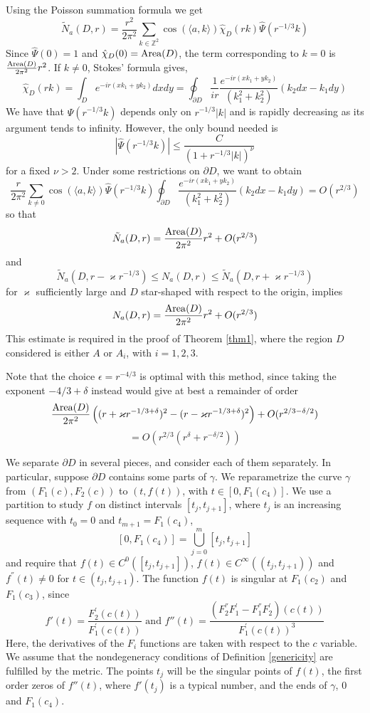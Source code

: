\documentclass[12pt]{amsart}
\numberwithin{equation}{subsection}
\theoremstyle{definition}
\theoremstyle{plain}
\begin{document}
Using the Poisson summation formula we get
\[
\tilde{N}_a(D,r) =
\frac{r^2}{2 \pi^2} \sum_{k \in \mathbb Z^2} \cos(\langle a,k \rangle) \hat{\chi}_{D}(rk) \hat{\Psi}(r^{-1/3}k)
\]
Since $\hat{\Psi}(0) = 1$ and $\hat{\chi}_{D}(0) = {{\rm {Area}}}(D)$, the term corresponding to $k=0$ is
$\frac{{{\rm {Area}}}(D)}{2 \pi^2} r^2$.
If $k \neq 0$, Stokes' formula gives,
\[
\hat{\chi}_{D}(rk) = \int_{D} e^{-ir(x k_1 + y k_2)} dx dy = \oint_{\partial D} \frac{1}{ir} \frac{e^{-ir(x k_1 + y k_2)}}{(k_1^2 + k_2^2)}(k_2 dx - k_1 dy)
\]
We have that $\hat{\Psi}(r^{-1/3}k)$ depends only on $r^{-1/3}|k|$ and is rapidly decreasing as its argument tends to infinity.
However, the only bound needed is
\[
|\hat{\Psi}(r^{-1/3}k)| \leq \frac{C}{(1+r^{-1/3}|k|)^\nu}
\]
for a fixed $\nu > 2$.
Under some restrictions on $\partial D$, we want to obtain
\begin{equation}
\frac{r}{2 \pi^2}
\sum_{k \neq 0}
\cos(\langle a,k \rangle) \hat{\Psi}(r^{-1/3}k)
\oint_{\partial D} \frac{e^{-ir(x k_1 + y k_2)}}{(k_1^2 + k_2^2)}(k_2 dx - k_1 dy)
= O(r^{2/3})
\end{equation}
so that
\[
\tilde{N}_a(D,r) = \frac{{{\rm {Area}}}(D)}{2 \pi^2} r^2 + O(r^{2/3})
\]
and
\[
\tilde{N}_a(D,r-\varkappa r^{-1/3}) \leq N_a(D,r) \leq \tilde{N}_a(D,r+\varkappa r^{-1/3})
\]
for $\varkappa$ sufficiently large and $D$ star-shaped with respect to the origin, implies
\[
N_a(D,r) = \frac{{{\rm {Area}}}(D)}{2 \pi^2} r^2 + O(r^{2/3})
\]
This estimate is required in the proof of Theorem \ref{thm1}, where the region $D$ considered is either $A$ or $A_i$, with $i = 1,2,3$.

Note that the choice $\epsilon = r^{-4/3}$ is optimal with this method,
since taking the exponent $-4/3 + \delta$ instead would give at best a remainder of order
\[
\frac{{{\rm {Area}}}(D)}{2 \pi^2} \left( (r+\varkappa r^{-1/3+\delta})^2 - (r-\varkappa r^{-1/3+\delta})^2 \right) + O(r^{2/3 - \delta/2})
\]
\[
= O(r^{2/3}(r^{\delta} +r^{-\delta/2}))
\]

We separate $\partial D$ in several pieces, and consider each of them separately.
In particular, suppose $\partial D$ contains some parts of $\gamma$.
We reparametrize the curve $\gamma$ from $(F_1(c),F_2(c))$ to $(t,f(t))$, with $t \in [0,F_{1}(c_{4})]$.
We use a partition to study $f$ on distinct intervals $[t_j,t_{j+1}]$, where $t_j$ is an increasing sequence with
$t_0=0$ and $t_{m+1}=F_{1}(c_{4})$,
\[
[0,F_{1}(c_4)] = \bigcup_{j=0}^{m} [t_j,t_{j+1}]
\]
and require that
$f(t) \in C^{0}([t_j,t_{j+1}])$, $f(t) \in C^{\infty}((t_j,t_{j+1}))$ and $f^{''}(t) \neq 0$ for $t \in (t_j,t_{j+1})$.
The function $f(t)$ is singular at $F_1(c_2)$ and $F_1(c_3)$, since
\[
f'(t) = \frac{F_{2}^{'}(c(t))}{F_{1}^{'}(c(t))} \text{ and } f''(t) = \frac{(F_{2}^{''}F_1^{'}-F_1^{''}F_2^{'})(c(t))}{F_{1}^{'}(c(t))^3}
\]
Here, the derivatives of the $F_i$ functions are taken with respect to the $c$ variable.
We assume that the nondegeneracy conditions of Definition \ref{genericity} are fulfilled by the metric.
The points $t_j$ will be the singular points of $f(t)$, the first order zeros of $f''(t)$, where $f'(t_j)$
is a typical number, and the ends of $\gamma$, $0$ and $F_{1}(c_4)$.
\end{document}
